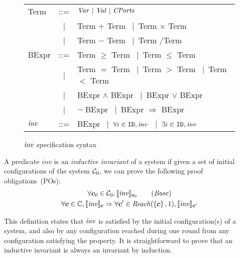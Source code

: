 \begin{figure}
\newcommand{\vbar}{{\normalfont\ |\ }}
\itshape
\begin{tabular}{l@{\ }r@{\ \ }l}
    Term   &   ::= & $\Var \vbar \Val \vbar \Cfield$                                           \\
           & \vbar & Term $+$ Term \vbar Term $\times$ Term                                    \\
           & \vbar & Term $-$ Term \vbar Term \slash Term                                      \\
    BExpr  &   ::= & Term $\geq$ Term \vbar Term $\leq$ Term                                   \\
           & \vbar & Term $=$ Term \vbar Term $>$ Term \vbar Term $<$ Term                     \\
           & \vbar & BExpr $\wedge$ BExpr \vbar BExpr $\vee$ BExpr                             \\
           & \vbar & $\neg$ BExpr \vbar BExpr $\Rightarrow$ BExpr                              \\
    $\mathit{inv}$ &   ::= & BExpr \vbar $\forall i \in \texttt{ID}, \mathit{inv}$ \vbar $\exists i \in \texttt{ID}, \mathit{inv}$
\end{tabular}

\caption{$\mathit{inv}$ specification syntax}\label{fig:inv-syntax}
\end{figure}


\begin{definition}
\label{def:ii}
A predicate $\mathit{inv}$ is an \emph{inductive invariant} of a system if given a set of initial configurations of the system $\mathcal{C}_0$,
we can prove the following proof obligations~(POs):
\begin{gather}
\forall \gconfig_0\in \gset_0, \eec{\Inv}{\gconfig_0} \label{po:base}\tag{\textit{Base}}\\
\forall \gconfig \in \pwg, \eec{\Inv}{\gconfig} \Rightarrow \forall \gconfig' \in \Reach(\left\{\gconfig\right\},1), \eec{\Inv}{\gconfig'} \label{po:ind-hyp-orig}
\end{gather}
\end{definition}
This definition states that $\mathit{inv}$ is satisfied by the initial configuration(s) of a system,
and also by any configuration reached during one round from any configuration satisfying the property.
It is straightforward to prove that an inductive invariant is always an invariant by induction.

